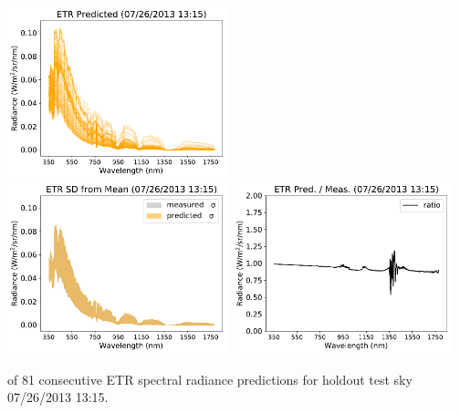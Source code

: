 \begin{center}
\includegraphics[width=0.48\textwidth]{img/07261315_predicted.pdf}\\
\vspace{0.2in}%
\includegraphics[width=0.48\textwidth]{img/07261315_std.pdf}
\includegraphics[width=0.48\textwidth]{img/07261315_ratio.pdf}
\end{center}

\clearpage
 of 81 consecutive ETR spectral radiance predictions for holdout test sky {07/26/2013 13:15}.\\%

